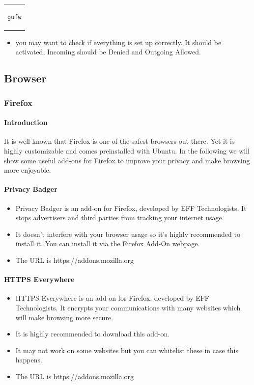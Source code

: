 \documentclass[a4paper,10pt]{article}
\begin{document}
\begin{center}
\begin{tabular}{c}
\begin{lstlisting}
gufw
\end{lstlisting}
\end{tabular}
\end{center}



\begin{itemize}[leftmargin=*]
\item you may want to check if everything is set up correctly. It should be activated, Incoming should be Denied and Outgoing Allowed.
\end{itemize}


\subsection{Browser}
\subsubsection{Firefox}
\paragraph{Introduction}
It is well known that Firefox is one of the safest browsers out there.\cite{firefoxSafe} Yet it is highly customizable and comes preinstalled with Ubuntu. In the following we will show some useful add-ons for Firefox to improve your privacy and make browsing more enjoyable.

\paragraph{Privacy Badger}
\begin{itemize}[leftmargin=*]
\item Privacy Badger is an add-on for Firefox, developed by EFF Technologists. It stops advertisers and third parties from tracking your internet usage.
\item It doesn't interfere with your browser usage so it's highly recommended to install it. You can install it via the Firefox Add-On webpage.
\item The URL is https://addons.mozilla.org
\end{itemize}

\paragraph{HTTPS Everywhere}
\begin{itemize}[leftmargin=*]
\item HTTPS Everywhere is an add-on for Firefox, developed by EFF Technologists. It encrypts your communications with many websites which will make browsing more secure.
\item It is highly recommended to download this add-on.
\item It may not work on some websites but you can whitelist these in case this happens.
\item The URL is https://addons.mozilla.org
\end{itemize}
\end{document}
